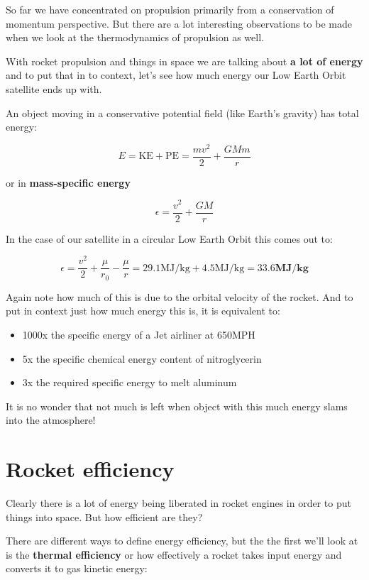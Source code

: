 \documentclass[twocolumn]{memoir} %
\begin{document}
So far we have concentrated on propulsion primarily from a conservation
of momentum perspective. But there are a lot interesting observations to
be made when we look at the thermodynamics of propulsion as well.

With rocket propulsion and things in space we are talking about
\textbf{a lot of energy} and to put that in to context, let's see how
much energy our Low Earth Orbit satellite ends up with.

An object moving in a conservative potential field (like Earth's
gravity) has total energy:

\[E = \text{KE} + \text{PE} = \frac{m v^2}{2} + \frac{GMm}{r}\]

or in \textbf{mass-specific energy}

\[\epsilon = \frac{v^2}{2} + \frac{GM}{r}\]

In the case of our satellite in a circular Low Earth Orbit this comes
out to:

\[\epsilon = \frac{v^2}{2} + \frac{\mu}{r_0} - \frac{\mu}{r} = 29.1 \text{MJ/kg} + 4.5 \text{MJ/kg} = \mathbf{33.6} \textbf{MJ/kg}\]

Again note how much of this is due to the orbital velocity of the
rocket. And to put in context just how much energy this is, it is
equivalent to:

\begin{itemize}
\item
  1000x the specific energy of a Jet airliner at 650MPH
\item
  5x the specific chemical energy content of nitroglycerin
\item
  3x the required specific energy to melt aluminum
\end{itemize}

It is no wonder that not much is left when object with this much energy
slams into the atmosphere!

\section{Rocket efficiency}\label{rocket-efficiency}

Clearly there is a lot of energy being liberated in rocket engines in
order to put things into space. But how efficient are they?

There are different ways to define energy efficiency, but the the first
we'll look at is the \textbf{thermal efficiency} or how effectively a
rocket takes input energy and converts it to gas kinetic energy:
\end{document}
